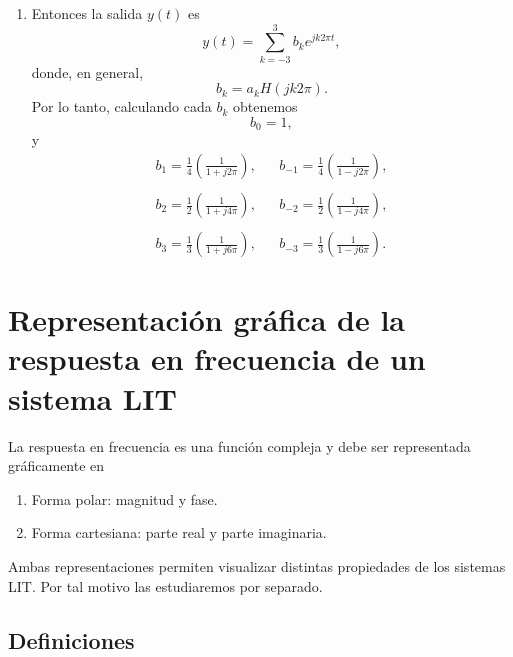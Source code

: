 \begin{enumerate}
\item Entonces la salida $y\left( t\right) $ es 
\begin{equation}
y\left( t\right) = \sum_{k=-3}^{3}b_{k}e^{jk2\pi t},
\end{equation}
donde, en general,
\begin{equation}
b_{k} = a_{k} H\left( jk2\pi \right).
\end{equation}
Por lo tanto, calculando cada $b_{k}$ obtenemos
\begin{equation}
b_{0} = 1,
\end{equation}
y
\begin{equation}
  \begin{array}{ccc}
  b_{1} =\frac{1}{4}\left( \frac{1}{1+j2\pi }\right), &&
  b_{-1}=\frac{1}{4}\left( \frac{1}{1-j2\pi }\right), \\
  \\
  b_{2} =\frac{1}{2}\left( \frac{1}{1+j4\pi }\right), &&
  b_{-2}=\frac{1}{2}\left( \frac{1}{1-j4\pi }\right), \\
  \\
  b_{3} =\frac{1}{3}\left( \frac{1}{1+j6\pi }\right), &&
  b_{-3}=\frac{1}{3}\left( \frac{1}{1-j6\pi }\right).
  \end{array}
\end{equation}

\end{enumerate}

\section{Representaci\'{o}n gr\'{a}fica de la respuesta en frecuencia de un sistema LIT}

La respuesta en frecuencia es una funci\'{o}n compleja y debe ser representada gr\'{a}ficamente en
\begin{enumerate}
        \item   Forma polar: magnitud y fase.
        
        \item   Forma cartesiana: parte real y parte imaginaria.
\end{enumerate}

Ambas representaciones permiten visualizar distintas propiedades de los sistemas LIT. Por tal motivo las
estudiaremos por separado.

\subsection{Definiciones}

